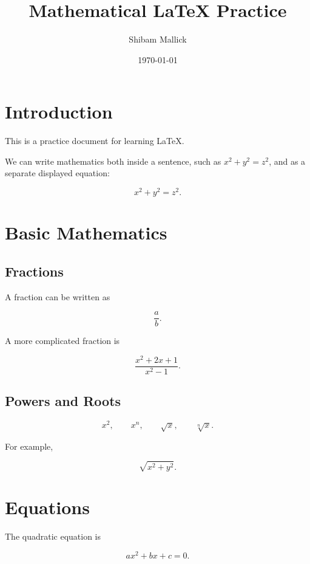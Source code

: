 \documentclass[12pt,a4paper]{article}
\title{Mathematical LaTeX Practice}
\author{Shibam Mallick}
\date{\today}
\begin{document}
\maketitle

\tableofcontents

\newpage

\section{Introduction}

This is a practice document for learning \LaTeX.

We can write mathematics both inside a sentence, such as
\(x^2 + y^2 = z^2\), and as a separate displayed equation:

\[
x^2 + y^2 = z^2.
\]

\section{Basic Mathematics}

\subsection{Fractions}

A fraction can be written as

\[
\frac{a}{b}.
\]

A more complicated fraction is

\[
\frac{x^2 + 2x + 1}{x^2 - 1}.
\]

\subsection{Powers and Roots}

\[
x^2,\qquad
x^n,\qquad
\sqrt{x},\qquad
\sqrt[n]{x}.
\]

For example,

\[
\sqrt{x^2 + y^2}.
\]

\section{Equations}

The quadratic equation is

\[
ax^2 + bx + c = 0.
\]
\end{document}
